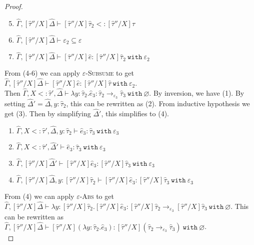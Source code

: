 \documentclass{llncs}
\newcommand{\keywadj}[1]{\mathtt{#1}}
\newcommand{\keyw}[1]{\keywadj{#1}~}
\newcommand{\kw}[1]{\keyw{ #1 }}
\begin{document}
\begin{proof}
\begin{enumerate}
	\setcounter{enumi}{4}
	\item $\hat \Gamma, [\hat \tau''/X]\hat \Delta \vdash [\hat \tau''/X]\hat \tau_2 <: [\hat \tau''/X]\hat \tau$
	\item $\hat \Gamma, [\hat \tau''/X]\hat \Delta \vdash \varepsilon_2 \subseteq \varepsilon$
	\item $\hat \Gamma, [\hat \tau''/X]\hat \Delta \vdash [\hat \tau''/X]\hat e: [\hat \tau''/X]\hat \tau_2~\kw{with} \varepsilon_2$
\end{enumerate}

From (4-6) we can apply \textsc{$\varepsilon$-Subsume} to get $\hat \Gamma, [\hat \tau''/X]\hat \Delta \vdash [\hat \tau''/X]\hat e: [\hat \tau''/X]\hat \tau~\kw{with} \varepsilon_2$. \\

 Then $\hat \Gamma, X <: \hat \tau', \hat \Delta \vdash \lambda y: \hat \tau_2. \hat e_3: \hat \tau_2 \rightarrow_{\varepsilon_3} \hat \tau_3~\kw{with} \varnothing$. By inversion, we have (1). By setting $\hat \Delta' = \hat \Delta, y: \hat \tau_2$, this can be rewritten as (2). From inductive hypothesis we get (3). Then by simplifying $\hat \Delta'$, this simplifies to (4).

\begin{enumerate}
	\item $\hat \Gamma, X <: \hat \tau', \hat \Delta, y: \hat \tau_2 \vdash \hat e_3: \hat \tau_3~\kw{with} \varepsilon_3$
	\item $\hat \Gamma, X <: \hat \tau', \hat \Delta' \vdash \hat e_3: \hat \tau_3~\kw{with} \varepsilon_3$
	\item $\hat \Gamma, [\hat \tau''/X]\hat \Delta' \vdash [\hat \tau''/X]\hat e_3: [\hat \tau''/X]\hat \tau_3~\kw{with} \varepsilon_3$
	\item $\hat \Gamma, [\hat \tau''/X]\hat \Delta, y: [\hat \tau''/X]\hat \tau_2 \vdash [\hat \tau''/X]\hat e_3: [\hat \tau''/X]\hat \tau_3~\kw{with} \varepsilon_3$
\end{enumerate}

From (4) we can apply \textsc{$\varepsilon$-Abs} to get $\hat \Gamma, [\hat \tau''/X]\hat \Delta \vdash \lambda y: [\hat \tau''/X]\hat \tau_2. [\hat \tau''/X]\hat e_3: [\hat \tau''/X]\hat \tau_2 \rightarrow_{\varepsilon_3} [\hat \tau''/X]\hat \tau_3~\kw{with} \varnothing$. This can be rewritten as $\hat \Gamma, [\hat \tau''/X]\hat \Delta \vdash [\hat \tau''/X](\lambda y: \hat \tau_2. \hat e_3): [\hat \tau''/X](\hat \tau_2 \rightarrow_{\varepsilon_3} \hat \tau_3)~\kw{with} \varnothing$. \\

\end{proof}
\end{document}
